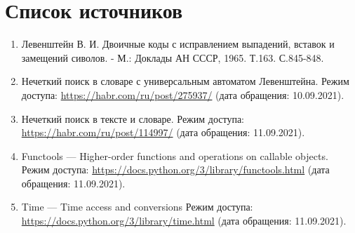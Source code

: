 %



\section*{\large Список источников}
\begin{enumerate}
	\item Левенштейн В. И. Двоичные коды с исправлением выпадений, вставок и замещений сиволов. - М.: Доклады АН СССР, 1965. Т.163. С.845-848.
	\item Нечеткий поиск в словаре с универсальным автоматом Левенштейна. Режим доступа: \url{https://habr.com/ru/post/275937/} (дата обращения: 10.09.2021).
	\item Нечеткий поиск в тексте и словаре. Режим доступа: \url{https://habr.com/ru/post/114997/} (дата обращения: 11.09.2021).
	\item Functools — Higher-order functions and operations on callable objects. Режим доступа: \url{https://docs.python.org/3/library/functools.html} (дата обращения: 11.09.2021).
	\item Time — Time access and conversions Режим доступа: \url{https://docs.python.org/3/library/time.html} (дата обращения: 11.09.2021).
\end{enumerate}